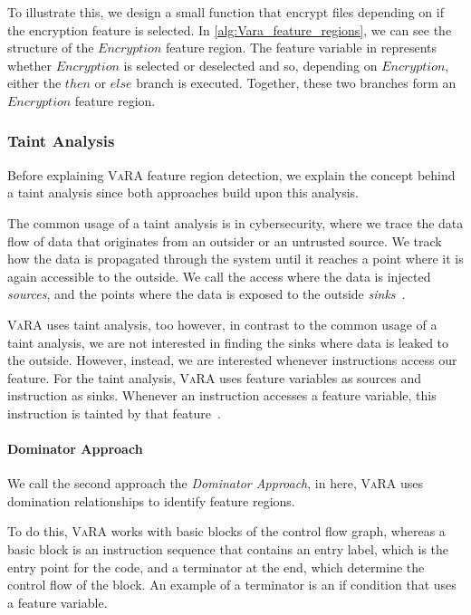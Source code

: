To illustrate this, we design a small function that encrypt files depending on if the encryption feature is selected.
In \autoref{alg:Vara_feature_regions}, we can see the structure of the $Encryption$ feature region. 
The feature variable in  represents whether $Encryption$ is selected or deselected and so, depending on $Encryption$, 
either the $then$ or $else$ branch is executed. 
Together, these two branches form an $Encryption$ feature region.

\subsubsection{Taint Analysis}
Before explaining \textsc{VaRA} feature region detection, we explain the concept behind a taint analysis since both approaches build upon this analysis.

The common usage of a taint analysis is in cybersecurity, where we trace the data flow of data that originates from an outsider or an untrusted source.
We track how the data is propagated through the system until it reaches a point where it is again accessible to the outside.
We call the access where the data is injected \emph{sources}, and the points where the data is exposed to the outside \emph{sinks}~\cite{TaintAnalysis}.

\textsc{VaRA} uses taint analysis, too however, in contrast to the common usage of a taint analysis, 
we are not interested in finding the sinks where data is leaked to the outside. However, instead, we are interested whenever instructions access our feature. 
For the taint analysis, \textsc{VaRA} uses feature variables as sources and instruction as sinks. Whenever an instruction accesses a feature variable, 
this instruction is tainted by that feature~\cite{VaRA-Janik}.

\paragraph{Dominator Approach}
We call the second approach the \emph{Dominator Approach}, in here, \textsc{VaRA} uses domination relationships to identify feature regions.

To do this, \textsc{VaRA} works with basic blocks of the control flow graph, whereas a basic block is an instruction sequence that contains an entry label, 
which is the entry point for the code, and a terminator at the end, which determine the control flow of the block. 
An example of a terminator is an if condition that uses a feature variable.

